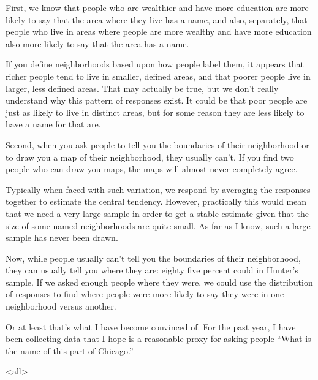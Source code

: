 {First, we know that people who are wealthier and have more education
are more likely to say that the area where they live has a name, and
also, separately, that people who live in areas where people are more
wealthy and have more education also more likely to say that the area
has a name.

If you define neighborhoods based upon how people label them, it
appears that richer people tend to live in smaller, defined areas, and
that poorer people live in larger, less defined areas. That may
actually be true, but we don't really understand why this pattern of
responses exist. It could be that poor people are just as likely to
live in distinct areas, but for some reason they are less likely to
have a name for that are.

Second, when you ask people to tell you the boundaries of their
neighborhood or to draw you a map of their neighborhood, they usually
can't. If you find two people who can draw you maps, the maps will
almost never completely agree. 

Typically when faced with such variation, we respond by averaging the
responses together to estimate the central tendency. However,
practically this would mean that we need a very large sample in order
to get a stable estimate given that the size of some named
neighborhoods are quite small. As far as I know, such a large sample
has never been drawn.

Now, while people usually can't tell you the boundaries of their
neighborhood, they can usually tell you where they are: eighty five
percent could in Hunter's sample. If we asked enough people where they
were, we could use the distribution of responses to find where people
were more likely to say they were in one neighborhood versus another.

Or at least that's what I have become convinced of. For the past year,
I have been collecting data that I hope is a reasonable proxy for
asking people ``What is the name of this part of Chicago.''

\mode<all>{
}

}
